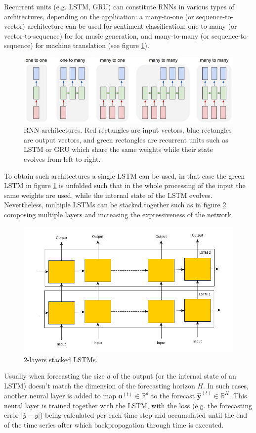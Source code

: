 \documentclass[a4paper]{article} %
\begin{document}
	Recurrent units (e.g. LSTM, GRU) can constitute RNNs in various types of architectures, depending on the application: a many-to-one (or sequence-to-vector) architecture can be used for sentiment classification, one-to-many (or vector-to-sequence) for for music generation, and many-to-many (or sequence-to-sequence) for machine translation (see figure \ref{fig:rnn_architectures}).
	\begin{figure}
		\includegraphics[width=\linewidth]{img/rnn_architectures.png}
		\caption{RNN architectures. Red rectangles are input vectors, blue rectangles are output vectors, and green rectangles are recurrent units such as LSTM or GRU which share the same weights while their state evolves from left to right.}
		\label{fig:rnn_architectures}
	\end{figure}

	To obtain such architectures a single LSTM can be used, in that case the green LSTM in figure \ref{fig:rnn_architectures} is unfolded such that in the whole processing of the input the same weights are used, while the internal state of the LSTM evolves.	Nevertheless, multiple LSTMs can be stacked together such as in figure \ref{fig:stacked_lstm} composing multiple layers and increasing the expressiveness of the network.
	\begin{figure}
		\includegraphics[width=\linewidth]{img/stacked_lstm.png}
		\caption{2-layers stacked LSTMs. }
		\label{fig:stacked_lstm}
	\end{figure}
	Usually when forecasting the size $d$ of the output (or the internal state of an LSTM) doesn't match the dimension of the forecasting horizon $H$. In such cases, another neural layer is added to map $\pmb{o}^{(t)} \in \mathbb{R}^d$ to the forecast $\hat{\pmb{y}}^{(t)} \in \mathbb{R}^H$. This neural layer is trained together with the LSTM, with the loss (e.g. the forecasting error $|\hat{y} - y|$) being calculated per each time step and accumulated until the end of the time series after which backpropagation through time is executed.
	
\end{document}
